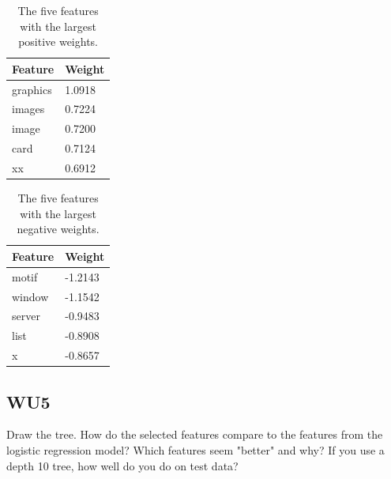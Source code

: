 \documentclass[a4paper,11pt]{article}
\begin{document}
\begin{table}[!ht]
\begin{center}
    \caption{The five features with the largest positive weights.}
    \begin{tabular}{| l | l |}
    \hline
    Feature  & Weight \\ \hline
    graphics & 1.0918 \\ \hline %
    images   & 0.7224 \\ \hline %
    image    & 0.7200 \\ \hline %
    card     & 0.7124 \\ \hline %
    xx       & 0.6912 \\ \hline %
    \end{tabular}
    \label{tables:WU4Neg}
\end{center}
\end{table}

\begin{table}[!ht]
\begin{center}
    \caption{The five features with the largest negative weights.}
    \begin{tabular}{| l | l |}
    \hline
    Feature &  Weight \\ \hline
    motif   & -1.2143 \\ \hline %
    window  & -1.1542 \\ \hline %
    server  & -0.9483 \\ \hline %
    list    & -0.8908 \\ \hline %
    x       & -0.8657 \\ \hline %
    \end{tabular}
    \label{tables:WU4Pos}
\end{center}
\end{table}

\subsection{WU5}
\textsf{ Draw the tree. How do the selected features compare to the
  features from the logistic regression model? Which features seem
  "better" and why? If you use a depth 10 tree, how well do you do on
  test data?}\\
\end{document}
